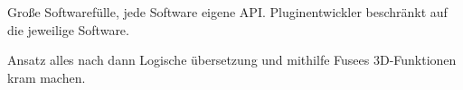  \label{sec:Frage}


Große Softwarefülle, jede Software eigene API. Pluginentwickler beschränkt auf die jeweilige Software.

Ansatz alles nach \CS dann Logische übersetzung und mithilfe Fusees 3D-Funktionen kram machen.